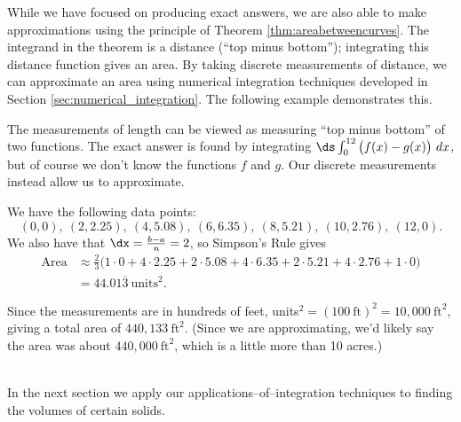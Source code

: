 While we have focused on producing exact answers, we are also able to make approximations using the principle of Theorem \ref{thm:areabetweencurves}. The integrand in the theorem is a distance (``top minus bottom''); integrating this distance function gives an area. By taking discrete measurements of distance, we can approximate an area using numerical integration techniques developed in Section \ref{sec:numerical_integration}. The following example demonstrates this.\\

{The measurements of length can be viewed as measuring ``top minus bottom'' of two functions. The exact answer is found by integrating $\ds \int_0^{12} \big(f(x)-g(x)\big)\ dx$, but of course we don't know the functions $f$ and $g$. Our discrete measurements instead allow us to approximate.

We have the following data points:
$$(0,0),\ (2,2.25),\ (4,5.08),\ (6,6.35),\ (8,5.21),\ (10,2.76),\ (12,0).$$
We also have that $\dx=\frac{b-a}{n} = 2$, so Simpson's Rule gives
\begin{align*}
\text{Area}&\approx \frac{2}{3}\Big(1\cdot0+4\cdot2.25+2\cdot5.08+4\cdot6.35+2\cdot5.21+4\cdot2.76+1\cdot0\Big)\\
			&= 44.01\overline{3} \ \text{units}^2.
\end{align*}

Since the measurements are in hundreds of feet, units${}^2 = (100\ \text{ft})^2 = 10,000\ \text{ft}^2$, giving a total area of $440,133\ \text{ft}^2$. (Since we are approximating, we'd likely say the area was about $440,000\ \text{ft}^2$, which is a little more than 10 acres.)
}
\\

In the next section we apply our applications--of--integration techniques to finding the volumes of certain solids.
